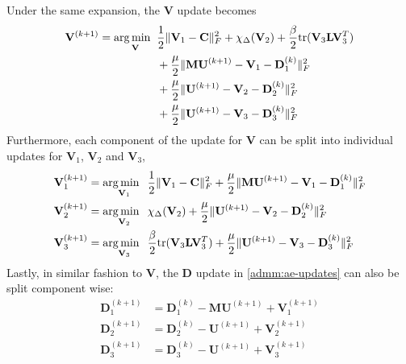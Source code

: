Under the same expansion, the $\mathbf{V}$ update becomes
\begin{equation*}
  \begin{aligned}
    \mathbf{V}^{(k+1)} = \operatorname*{arg\,min \;\;}_{\mathbf{V}}  &  \frac{1}{2} \|\mathbf{V}_1 - \mathbf{C} \|_F^2 + \chi_{\Delta}(\mathbf{V}_2) + \frac{\beta}{2}\text{tr}(\mathbf{V}_3\mathbf{L}\mathbf{V}_3^T) \\ 
    & + \frac{\mu}{2} \|\mathbf{MU}^{(k+1)} - \mathbf{V}_1 - \mathbf{D}_1^{(k)}\|_F^2 \\
    & + \frac{\mu}{2} \|\mathbf{U}^{(k+1)} - \mathbf{V}_2 - \mathbf{D}_2^{(k)}\|_F^2 \\
    & + \frac{\mu}{2} \|\mathbf{U}^{(k+1)} - \mathbf{V}_3 - \mathbf{D}_3^{(k)}\|_F^2 
  \end{aligned}
\end{equation*}
Furthermore, each component of the update for $\mathbf{V}$ can be split into individual updates for $\mathbf{V}_1$, $\mathbf{V}_2$ and $\mathbf{V}_3$,
\begin{equation}
  \label{admm:ae-updates-v}
  \begin{aligned}
    \mathbf{V}_1^{(k+1)} &= \operatorname*{arg\,min \;\;}_{\mathbf{V}_1} \frac{1}{2} \|\mathbf{V}_1 - \mathbf{C} \|_F^2 + \frac{\mu}{2} \|\mathbf{MU}^{(k+1)} - \mathbf{V}_1 - \mathbf{D}_1^{(k)}\|_F^2 \\
    \mathbf{V}_2^{(k+1)} &= \operatorname*{arg\,min \;\;}_{\mathbf{V}_2} \chi_{\Delta}(\mathbf{V}_2) + \frac{\mu}{2} \|\mathbf{U}^{(k+1)} - \mathbf{V}_2 - \mathbf{D}_2^{(k)}\|_F^2 \\
    \mathbf{V}_3^{(k+1)} &= \operatorname*{arg\,min \;\;}_{\mathbf{V}_3} \frac{\beta}{2}\text{tr}(\mathbf{V}_3\mathbf{L}\mathbf{V}_3^T) + \frac{\mu}{2} \|\mathbf{U}^{(k+1)} - \mathbf{V}_3 - \mathbf{D}_3^{(k)}\|_F^2
  \end{aligned}
\end{equation}
Lastly, in similar fashion to $\mathbf{V}$, the $\mathbf{D}$ update in \eqref{admm:ae-updates} can also be split component wise:
\begin{equation}
  \label{admm:ae-updates-d}
  \begin{aligned}
    \mathbf{D}_1^{(k+1)} &= \mathbf{D}_1^{(k)} - \mathbf{MU}^{(k+1)} + \mathbf{V}_1^{(k+1)} \\
    \mathbf{D}_2^{(k+1)} &= \mathbf{D}_2^{(k)} - \mathbf{U}^{(k+1)} + \mathbf{V}_2^{(k+1)} \\
    \mathbf{D}_3^{(k+1)} &= \mathbf{D}_3^{(k)} - \mathbf{U}^{(k+1)} + \mathbf{V}_3^{(k+1)} 
  \end{aligned}
\end{equation}
